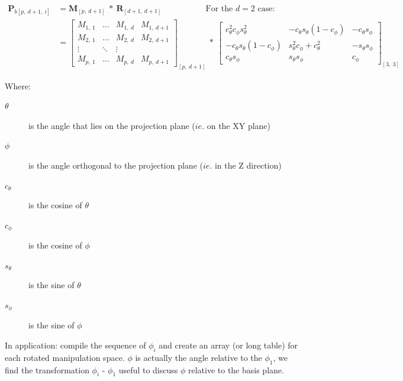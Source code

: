 \documentclass{monashthesis}
\begin{document}
\begin{align*}
  \textbf{P}_{b[p,~d+1,~i]}
  &= \textbf{M}_{[p,~d+1]} ~*~ \textbf{R}_{[d+1,~d+1]} 
    ~~~~~~~~~~~~~~~~~~~~~~~~\text{For the $d=2$ case:} \\
  &= \begin{bmatrix}
    M_{1,~1} & \dots & M_{1,~d} & M_{1,~d+1} \\
    M_{2,~1} & \dots & M_{2,~d} & M_{2,~d+1} \\
    \vdots   & \ddots& \vdots   \\
    M_{p,~1} & \dots & M_{p,~d} & M_{p,~d+1}
  \end{bmatrix}_{[p,~d+1]}
    ~*~
  \begin{bmatrix}
    c_\theta^2 c_\phi s_\theta^2 &
    -c_\theta s_\theta (1 - c_\phi) &
    -c_\theta s_\phi \\
    -c_\theta s_\theta (1 - c_\phi) &
    s_\theta^2 c_\phi + c_\theta^2 &
    -s_\theta s_\phi \\
    c_\theta s_\phi &
    s_\theta s_\phi &
    c_\phi
  \end{bmatrix}_{[3,~3]}
\end{align*}

Where:

\begin{description}
  \item[$\theta$] is the angle that lies on the projection plane ($ie.$ on the XY plane)
  \item[$\phi$] is the angle orthogonal to the projection plane ($ie.$ in the Z direction)
  \item[$c_\theta$] is the cosine of $\theta$
  \item[$c_\phi$]   is the cosine of $\phi$
  \item[$s_\theta$] is the sine of   $\theta$
  \item[$s_\phi$]   is the sine of   $\phi$
\end{description}

In application: compile the sequence of \(\phi_i\) and create an array
(or long table) for each rotated manipulation space. \(\phi\) is
actually the angle relative to the \(\phi_1\), we find the
transformation \(\phi_i\) - \(\phi_1\) useful to discuss \(\phi\)
relative to the basis plane.

\begin{Shaded}
\begin{Highlighting}[]
 
\StringTok{ }\OperatorTok{+}\StringTok{ }
\StringTok{ }\NormalTok{(manip_space, theta, phi)[, }\OperatorTok{:}\NormalTok{]}
\NormalTok{\}}
\end{Highlighting}
\end{Shaded}
\end{document}
